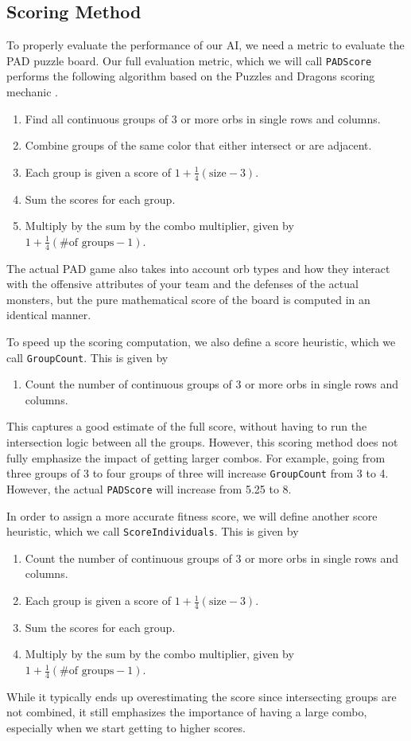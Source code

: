 \documentclass[journal,final,letterpaper,11pt]{IEEEtran}
\begin{document}
\subsection{Scoring Method}
To properly evaluate the performance of our AI, we need a metric to evaluate the PAD puzzle board. Our full evaluation metric, which we will call \texttt{PADScore} performs the following algorithm based on the Puzzles and Dragons scoring mechanic \cite{1}.
\begin{enumerate}
\item Find all continuous groups of 3 or more orbs in single rows and columns.
\item Combine groups of the same color that either intersect or are adjacent.
\item Each group is given a score of $1 + \frac{1}{4}(\mbox{size} - 3)$. \item Sum the scores for each group.
\item Multiply by the sum by the combo multiplier, given by $1 + \frac{1}{4}(\mbox{\# of groups} - 1)$.
\end{enumerate}
The actual PAD game also takes into account orb types and how they interact with the offensive attributes of your team and the defenses of the actual monsters, but the pure mathematical score of the board is computed in an identical manner. 

To speed up the scoring computation, we also define a score heuristic, which we call \texttt{GroupCount}. This  is given by
\begin{enumerate}
\item Count the number of continuous groups of 3 or more orbs in single rows and columns.
\end{enumerate}
This captures a good estimate of the full score, without having to run the intersection logic between all the groups. However, this scoring method does not fully emphasize the impact of getting larger combos. For example, going from three groups of 3 to four groups of three will increase \texttt{GroupCount} from 3 to 4. However, the actual \texttt{PADScore} will increase from 5.25 to 8.

In order to assign a more accurate fitness score, we will define another score heuristic, which we call \texttt{ScoreIndividuals}. This is given by
\begin{enumerate}
\item Count the number of continuous groups of 3 or more orbs in single rows and columns.
\item Each group is given a score of $1 + \frac{1}{4}(\mbox{size} - 3)$. 
\item Sum the scores for each group.
\item Multiply by the sum by the combo multiplier, given by $1 + \frac{1}{4}(\mbox{\# of groups} - 1)$.
\end{enumerate}
While it typically ends up overestimating the score since intersecting groups are not combined, it still emphasizes the importance of having a large combo, especially when we start getting to higher scores.
\end{document}
